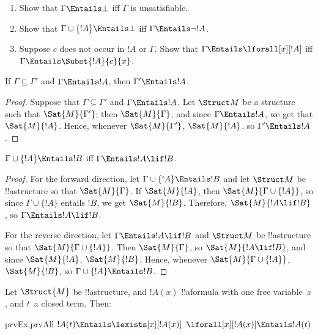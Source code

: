 \begin{prob}
\begin{enumerate}
\item Show that $\Gamma \Entails \bot$ iff $\Gamma$ is unsatisfiable.
\item Show that $\Gamma \cup \{!A\} \Entails \bot$ iff $\Gamma \Entails \lnot !A$.
\item Suppose $c$ does not occur in $!A$ or $\Gamma$.  Show that
  $\Gamma \Entails \lforall[x][!A]$ iff $\Gamma \Entails
  \Subst{!A}{c}{x}$.
\end{enumerate}
\end{prob}

\begin{prop}
If $\Gamma \subseteq \Gamma'$ and $\Gamma \Entails !A$, then $\Gamma'
\Entails !A$.
\end{prop}

\begin{proof}
Suppose that $\Gamma \subseteq \Gamma'$ and $\Gamma \Entails !A$. Let
$\Struct M$ be a structure such that $\Sat{M}{\Gamma'}$; then $\Sat{M}{\Gamma}$,
and since $\Gamma \Entails !A$, we get that $\Sat{M}{!A}$. Hence,
whenever $\Sat{M}{\Gamma'}$, $\Sat{M}{!A}$, so $\Gamma' \Entails !A$.
\end{proof}


\begin{thm}
$\Gamma \cup \{!A\} \Entails !B$ iff $\Gamma \Entails !A \lif !B$.
\end{thm}

\begin{proof}
For the forward direction, let $\Gamma \cup \{ !A \} \Entails !B$ and
let $\Struct M$ be !!a{structure} so that $\Sat{M}{\Gamma}$. If
$\Sat{M}{!A}$, then $\Sat{M}{\Gamma \cup \{ !A \} }$, so since $\Gamma
\cup \{ !A \}$ entails $!B$, we get $\Sat{M}{!B}$. Therefore,
$\Sat{M}{!A \lif !B}$, so $\Gamma \Entails !A \lif !B$.

For the reverse direction, let $\Gamma \Entails !A \lif !B$ and
$\Struct M$ be !!a{structure} so that $\Sat{M}{\Gamma \cup \{ !A
  \}}$. Then $\Sat{M}{\Gamma}$, so $\Sat{M}{!A \lif !B}$, and since
$\Sat{M}{!A}$, $\Sat{M}{!B}$. Hence, whenever $\Sat{M}{\Gamma \cup \{
  !A \} }$, $\Sat{M}{!B}$, so $\Gamma \cup \{ !A \} \Entails !B$.
\end{proof}

\begin{prop}
  Let $\Struct{M}$ be !!a{structure}, and $!A(x)$ !!a{formula} with
  one free variable~$x$, and $t$~a closed term. Then:
  \begin{tagenumerate}{prvEx,prvAll}
    $!A(t) \Entails \lexists[x][!A(x)]$
    $\lforall[x][!A(x)] \Entails !A(t)$
  \end{tagenumerate}
\end{prop}

